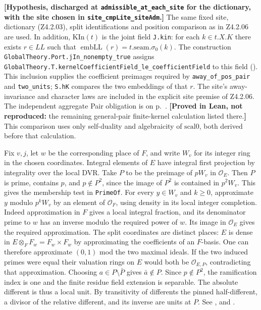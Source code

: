 \noindent\textbf{[Hypothesis, discharged at \nolinkurl{admissible_at_each_site} for the dictionary, with the site chosen in \nolinkurl{site_cmpLite_siteAdm}.]}
The same fixed site, dictionary (Z4.2.03), split identifications and
position comparison as in Z4.2.06 are used. In addition,
\(\mathrm{KIn}(t)\) is the joint field \nolinkurl{J.kin}: for each
\(k\in t.X.K\) there exists \(r\in LL\) such that
\(\operatorname{embLL}(r)=t.\mathrm{seam}.\sigma_0(k)\).
The construction \nolinkurl{GlobalTheory.Port.jIn_nonempty_true} assigns
\nolinkurl{GlobalTheory.T.kernelCoefficientField_le_coefficientField} to
this field ().
This inclusion supplies the coefficient preimages required by \nolinkurl{away_of_pos_pair} and
\nolinkurl{two_units}; \nolinkurl{S.hK} compares the two embeddings
of that \(r\). The site's away-invariance and character laws are
included in the explicit site premise of Z4.2.06. The independent
aggregate Pair obligation is on p.~\pageref{r8:Z4.2.04}.
\textbf{[Proved in Lean, not reproduced:} the remaining general-pair
finite-kernel calculation listed there.\textbf{]} This comparison uses
only self-duality and algebraicity of \(\mathrm{scal0}\), both derived
before that calculation.

Fix \(v,j\), let \(w\) be the corresponding place of \(F\), and write
\(W_v\) for its integer ring in the chosen coordinates. Integral elements
of \(E\) have integral first projection by integrality over the local DVR.
Take \(P\) to be the preimage of \(pW_v\) in \(\mathcal O_E\).
Then \(P\) is prime, contains \(p\), and \(p\notin P^2\), since the
image of \(P^2\) is contained in \(p^2W_v\). This gives the
membership test in \nolinkurl{PrimeOf}. For every \(y\in W_v\) and
\(k\ge0\), approximate \(y\) modulo \(p^kW_v\) by an element of
\(\mathcal O_F\), using density in its local integer completion.
Indeed approximation in \(F\) gives a local integral fraction, and its
denominator prime to \(w\) has an inverse modulo the required power of
\(w\). Its image in \(\mathcal O_E\) gives the required approximation.
The split coordinates are distinct places: \(E\) is dense in
\(E\otimes_F F_w=F_w\times F_w\) by approximating the coefficients of
an \(F\)-basis. One can therefore approximate \((0,1)\) mod the two
maximal ideals. If the two induced primes were equal their valuation
rings on \(E\) would both be \(\mathcal O_{E,P}\), contradicting that
approximation. Choosing \(a\in P\setminus\bar P\) gives
\(\bar a\notin P\). Since \(p\notin P^2\), the ramification index is
one and the finite residue field extension is separable. The absolute
different is thus a local unit. By transitivity of differents the
pinned half-different, a divisor of the relative different, and its
inverse are units at \(P\).
See ,
 and
.

